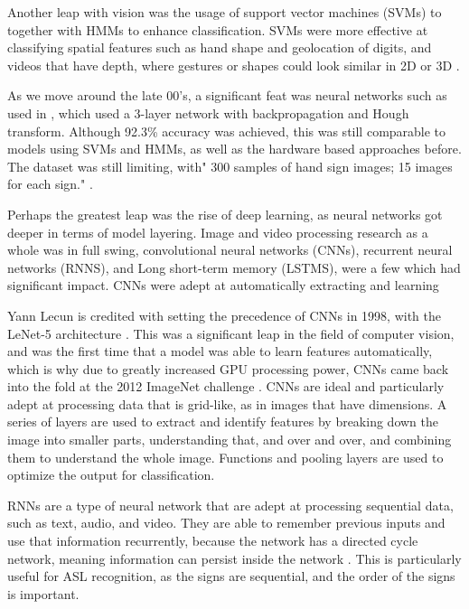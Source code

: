 Another leap with vision was the usage of support vector machines (SVMs) to together with HMMs to enhance classification. SVMs were more effective at classifying spatial features such as hand shape and geolocation of digits, and videos that have depth, where gestures or shapes could look similar in 2D or 3D \cite{voglerParallelHiddenMarkov1999a}.

As we move around the late 00's, a significant feat was neural networks such as used in \cite{munibAmericanSignLanguage2007b}, which used a 3-layer network with backpropagation and Hough transform. Although 92.3\% accuracy was achieved, this was still comparable to models using SVMs and HMMs, as well as the hardware based approaches before. The dataset was still limiting, with" 300 samples of hand sign images; 15 images for each sign." \cite{munibAmericanSignLanguage2007b}.

Perhaps the greatest leap was the rise of deep learning, as neural networks got deeper in terms of model layering. Image and video processing research as a whole was in full swing, convolutional neural networks (CNNs), recurrent neural networks (RNNS), and Long short-term memory (LSTMS), were a few which had significant impact. CNNs were adept at automatically extracting and learning


Yann Lecun is credited with setting the precedence of CNNs in 1998, with the LeNet-5 architecture \cite{lecunGradientbasedLearningApplied1998}. This was a significant leap in the field of computer vision, and was the first time that a model was able to learn features automatically, which is why due to greatly increased GPU processing power, CNNs came back into the fold at the 2012 ImageNet challenge \cite{krizhevskyImageNetClassificationDeep2012}. CNNs are ideal and particularly adept at processing data that is grid-like, as in images that have dimensions.  A series of layers are used to extract and identify features by breaking down the image into smaller parts, understanding that, and over and over, and combining them to understand the whole image. Functions and pooling layers are used to optimize the output for classification.

RNNs are a type of neural network that are adept at processing sequential data, such as text, audio, and video. They are able to remember previous inputs and use that information recurrently, because the network has a directed cycle network, meaning information can persist inside the network \cite{sherstinskyFundamentalsRecurrentNeural2020}. This is particularly useful for ASL recognition, as the signs are sequential, and the order of the signs is important.

